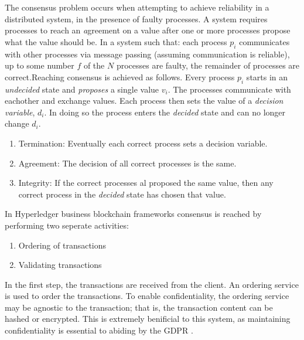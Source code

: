 \documentclass{report}
\begin{document}
\begin{flushleft}
The consensus problem occurs when attempting to achieve reliability in a distributed system, in the presence of faulty processes. 
A system requires processes to reach an \emph agreement on a value after one or more processes propose what the value should be. 
In a system such that: each process $p_i$ communicates with other processes via message passing (assuming communication is reliable), up to some number $f$ of the $N$ processes are faulty, the remainder of processes are correct.\linebreak[1]
Reaching consensus is achieved as follows. 
Every process $ p_i $ starts in an \emph{undecided} state and \emph{proposes} a single value $v_i$.
The processes communicate with eachother and exchange values. 
Each process then sets the value of a \emph{decision variable}, $d_i$. 
In doing so the process enters the \emph{decided} state and can no longer change $d_i$.\cite{coulouris_distributed_2011}
\begin{enumerate}
	\item Termination: Eventually each correct process sets a decision variable.
	\item Agreement: The decision of all correct processes is the same.
	\item Integrity: If the correct processes al proposed the same value, then any correct process in the \emph{decided} state has chosen that value.\cite{coulouris_distributed_2011}
\end{enumerate}

In Hyperledger business blockchain frameworks consensus is reached by performing two seperate activities:
\begin{enumerate}
  \item Ordering of transactions
  \item Validating transactions
\end{enumerate}
In the first step, the transactions are received from the client.
An ordering service is used to order the transactions. 
To enable confidentiality, the ordering service may be agnostic to the transaction; that is, the transaction content can be hashed or encrypted.\cite{noauthor_hyperledger_2017}
This is extremely benificial to this system, as maintaining confidentiality is essential to abiding by the GDPR \cite{noauthor_general_nodate}.


\end{flushleft}
\end{document}
